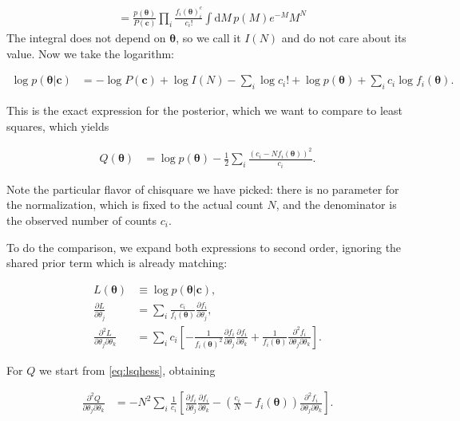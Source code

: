 \begin{align}
    &= \frac {p(\boldsymbol\theta)} {P(\mathbf c)}
    \prod_i
    \frac {f_i(\boldsymbol\theta)^c_i} {c_i!}
    \int \mathrm dM\, p(M) e^{-M} M^N
\end{align}
%
The integral does not depend on $\boldsymbol\theta$, so we call it $I(N)$ and
do not care about its value. Now we take the logarithm:

\begin{align}
    \log p(\boldsymbol\theta|\mathbf c) &=
    -\log P(\mathbf c) + \log I(N) - \sum_i \log c_i!
    + \log p(\boldsymbol\theta) + \sum_i c_i \log f_i(\boldsymbol\theta).
\end{align}

This is the exact expression for the posterior, which we want to compare to
least squares, which yields

\begin{align}
    Q(\boldsymbol\theta) &=
    \log p(\boldsymbol\theta)
    -\frac 12
    \sum_i \frac {(c_i - N f_i(\boldsymbol\theta))^2} {c_i}.
\end{align}

Note the particular flavor of chisquare we have picked: there is no parameter
for the normalization, which is fixed to the actual count $N$, and the
denominator is the observed number of counts $c_i$.

To do the comparison, we expand both expressions to second order, ignoring the
shared prior term which is already matching:

\begin{align}
    L(\boldsymbol\theta) &\equiv \log p(\boldsymbol\theta|\mathbf c), \\
    \frac {\partial L} {\partial\theta_j} &=
    \sum_i \frac {c_i} {f_i(\boldsymbol\theta)}
    \frac {\partial f_i} {\partial \theta_j}, \\
    \frac {\partial^2 L} {\partial\theta_j \partial\theta_k} &=
    \sum_i c_i \left[
    -\frac 1 {f_i(\boldsymbol\theta)^2}
    \frac {\partial f_i} {\partial \theta_j}
    \frac {\partial f_i} {\partial \theta_k}
    + \frac 1 {f_i(\boldsymbol\theta)}
    \frac {\partial^2 f_i} {\partial\theta_j \partial\theta_k}
    \right].
\end{align}

For $Q$ we start from \eqref{eq:lsqhess}, obtaining

\begin{align}
    \frac {\partial^2 Q} {\partial\theta_j \partial\theta_k} &=
    -N^2 \sum_i
    \frac 1 {c_i} \left[
    \frac {\partial f_i} {\partial \theta_j}
    \frac {\partial f_i} {\partial \theta_k}
    - \left( \frac{c_i} N - f_i(\boldsymbol\theta) \right)
    \frac {\partial^2 f_i} {\partial\theta_j \partial\theta_k}
    \right]. \label{eq:Qjk}
\end{align}

